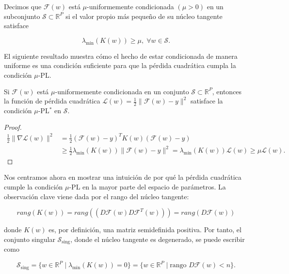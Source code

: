 \begin{definicion}
    Decimos que $\mathcal{F}(w)$ está $\mu$-uniformemente condicionada $(\mu > 0)$ en un subconjunto $\mathcal{S} \subset \mathbb{R}^{P}$ si el valor propio más pequeño de su núcleo tangente satisface

    \[
        \lambda_{\min}(K(w)) \geq \mu, \; \forall w \in \mathcal{S}.
    \]\newline
\end{definicion}

El siguiente resultado muestra cómo el hecho de estar condicionada de manera uniforme es una condición suficiente para que la pérdida cuadrática cumpla la condición $\mu$-PL.

\begin{teorema}
    Si $\mathcal{F}(w)$ está $\mu$-uniformemente condicionada en un conjunto $\mathcal{S} \subset \mathbb{R}^P$, entonces la función de pérdida cuadrática $\mathcal{L}(w) = \frac{1}{2} \|\mathcal{F}(w) - y \|^2$ satisface la condición $\mu$-PL$^*$ en $\mathcal{S}$.
\end{teorema}

\begin{proof}
    \[
        \begin{aligned}
            \frac{1}{2} \|\nabla \mathcal{L}(w)\|^2 &= \frac{1}{2} (\mathcal{F}(w) - y)^T K(w) (\mathcal{F}(w) - y) \\
            &\geq \frac{1}{2} \lambda_{\min}(K(w)) \|\mathcal{F}(w) - y \|^2 = \lambda_{\min}(K(w)) \mathcal{L}(w) \geq \mu \mathcal{L}(w).
        \end{aligned}
    \]

\end{proof}

Nos centramos ahora en mostrar una intuición de por qué la pérdida cuadrática cumple la condición $\mu$-PL en la mayor parte del espacio de parámetros. La observación clave viene dada por el rango del núcleo tangente:

\[
        rang(K(w)) = rang((D\mathcal{F}(w) D\mathcal{F}^T(w))) = rang(D\mathcal{F}(w))
\]

donde $K(w)$ es, por definición, una matriz semidefinida positiva. Por tanto, el conjunto singular $\mathcal{S}_{\text{sing}}$, donde el núcleo tangente es degenerado, se puede escribir como

\[
    \mathcal{S}_{\text{sing}} = \{w \in \mathbb{R}^P \mid \lambda_{\min}(K(w)) = 0\} = \{w \in \mathbb{R}^P \mid \text{rango } D\mathcal{F}(w) < n\}.
\]

